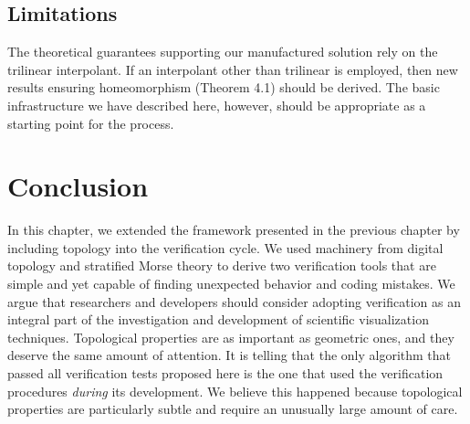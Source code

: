 
\subsection{Limitations}
The theoretical guarantees supporting our manufactured solution
rely on the trilinear interpolant.  
If an interpolant other than trilinear is employed, then new results ensuring
homeomorphism (Theorem 4.1) should be derived. 
The basic infrastructure we have described here, however,
should be appropriate as a starting point for the process.


\section{Conclusion}

In this chapter, we extended the framework presented in the previous chapter
by including topology into the verification
cycle.  We used machinery from digital topology and stratified Morse
theory to derive two verification tools that are simple and yet
capable of finding unexpected behavior and coding mistakes.
%
We argue that researchers and developers should consider adopting
verification as an integral part of the investigation and development
of scientific visualization techniques.  Topological properties are as
important as geometric ones, and they deserve the same amount of
attention. It is telling that the only algorithm that passed all
verification tests proposed here is the one that used
the verification procedures \emph{during} its development. We believe
this happened because topological properties are particularly subtle
and require an unusually large amount of care.


